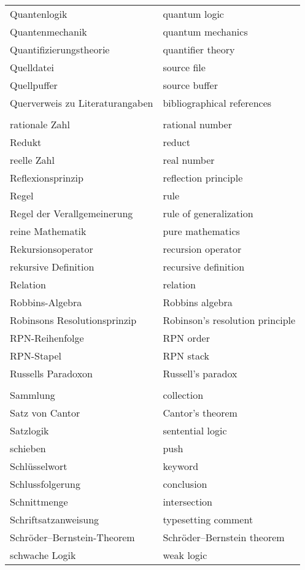 \begin{longtabu}   { @{} X[l] X[l] }
    Quantenlogik & quantum logic \\
    Quantenmechanik & quantum mechanics \\
    Quantifizierungstheorie & quantifier theory \\
    Quelldatei & source file \\
    Quellpuffer & source buffer \\
    Querverweis zu Literaturangaben & bibliographical references \\
     & \\
    rationale Zahl & rational number \\
    Redukt & reduct \\
    reelle Zahl & real number \\
    Reflexionsprinzip & reflection principle \\
    Regel & rule \\
    Regel der Verallgemeinerung & rule of generalization \\
    reine Mathematik & pure mathematics \\
    Rekursionsoperator & recursion operator \\
    rekursive Definition & recursive definition \\
    Relation & relation \\
    Robbins-Algebra & Robbins algebra \\
    Robinsons Resolutionsprinzip & Robinson's resolution principle \\
    RPN-Reihenfolge & RPN order \\
    RPN-Stapel & RPN stack \\
    Russells Paradoxon & Russell's paradox \\
     & \\
    Sammlung & collection \\
    Satz von Cantor & Cantor's theorem \\
    Satzlogik & sentential logic \\
    schieben & push \\
    Schlüsselwort & keyword \\
    Schlussfolgerung  & conclusion \\
    Schnittmenge & intersection \\
    Schriftsatzanweisung & typesetting comment \\
    Schröder--Bernstein-Theorem & Schröder--Bernstein theorem \\
    schwache Logik & weak logic \\

\end{longtabu}
